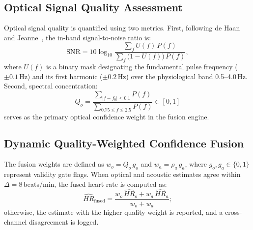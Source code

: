\documentclass[journal]{IEEEtran}
\newcommand{\HR}{\mathit{HR}}
\newcommand{\SNR}{\mathrm{SNR}}
\begin{document}
\subsection{Optical Signal Quality Assessment}
\label{sec:sqi}
Optical signal quality is quantified using two metrics. First, following de Haan and Jeanne~\cite{dehaan2013chrom}, the in-band signal-to-noise ratio is:
\begin{equation}
  \SNR = 10\log_{10}\frac{\sum_f U(f)\,P(f)}{\sum_f \big(1-U(f)\big)\,P(f)},
  \label{eq:snr}
\end{equation}
where $U(f)$ is a binary mask designating the fundamental pulse frequency ($\pm 0.1$\,Hz) and its first harmonic ($\pm 0.2$\,Hz) over the physiological band 0.5--4.0\,Hz. Second, spectral concentration:
\begin{equation}
  Q_o = \frac{\sum_{|f-f_0|\le 0.1} P(f)}{\sum_{0.75\le f\le 2.5} P(f)} \in [0,1]
  \label{eq:qopt}
\end{equation}
serves as the primary optical confidence weight in the fusion engine.

\subsection{Dynamic Quality-Weighted Confidence Fusion}
\label{sec:fusion}
The fusion weights are defined as $w_o = Q_o\, g_o$ and $w_a = \rho_a\, g_a$, where $g_o, g_a \in \{0, 1\}$ represent validity gate flags. When optical and acoustic estimates agree within $\Delta = 8$\,beats/min, the fused heart rate is computed as:
\begin{equation}
  \widehat{\HR}_{\mathrm{fused}} = \frac{w_o\,\widehat{\HR}_o + w_a\,\widehat{\HR}_a}{w_o + w_a};
  \label{eq:fusion}
\end{equation}
otherwise, the estimate with the higher quality weight is reported, and a cross-channel disagreement is logged.
\end{document}
